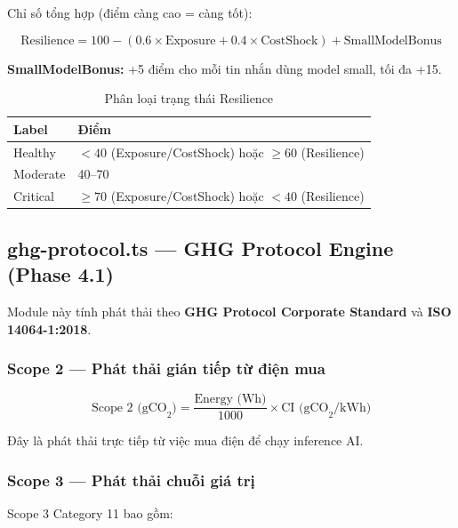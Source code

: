 \documentclass[12pt,a4paper]{article}
\begin{document}
Chỉ số tổng hợp (điểm càng cao = càng tốt):

\begin{equation}
    \text{Resilience} = 100 - (0.6 \times \text{Exposure} + 0.4 \times \text{CostShock}) + \text{SmallModelBonus}
\end{equation}

\textbf{SmallModelBonus:} +5 điểm cho mỗi tin nhắn dùng model small, tối đa +15.

\begin{table}[h]
    \centering
    \begin{tabular}{ll}
        \toprule
        \textbf{Label} & \textbf{Điểm} \\
        \midrule
        Healthy  & $< 40$ (Exposure/CostShock) hoặc $\geq 60$ (Resilience) \\
        Moderate & 40--70 \\
        Critical & $\geq 70$ (Exposure/CostShock) hoặc $< 40$ (Resilience) \\
        \bottomrule
    \end{tabular}
    \caption{Phân loại trạng thái Resilience}
\end{table}

\subsection{ghg-protocol.ts — GHG Protocol Engine (Phase 4.1)}

Module này tính phát thải theo \textbf{GHG Protocol Corporate Standard} và \textbf{ISO 14064-1:2018}.

\subsubsection{Scope 2 — Phát thải gián tiếp từ điện mua}

\begin{equation}
    \text{Scope 2 (gCO}_2\text{)} = \frac{\text{Energy (Wh)}}{1000} \times \text{CI (gCO}_2\text{/kWh)}
\end{equation}

Đây là phát thải trực tiếp từ việc mua điện để chạy inference AI.

\subsubsection{Scope 3 — Phát thải chuỗi giá trị}

Scope 3 Category 11 bao gồm:
\end{document}
